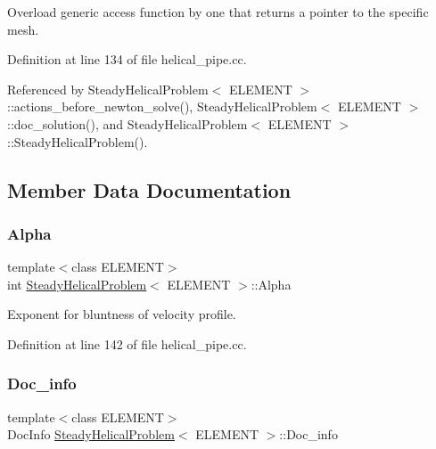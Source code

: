 Overload generic access function by one that returns a pointer to the specific mesh. 



Definition at line 134 of file helical\+\_\+pipe.\+cc.



Referenced by Steady\+Helical\+Problem$<$ E\+L\+E\+M\+E\+N\+T $>$\+::actions\+\_\+before\+\_\+newton\+\_\+solve(), Steady\+Helical\+Problem$<$ E\+L\+E\+M\+E\+N\+T $>$\+::doc\+\_\+solution(), and Steady\+Helical\+Problem$<$ E\+L\+E\+M\+E\+N\+T $>$\+::\+Steady\+Helical\+Problem().



\subsection{Member Data Documentation}
\mbox{\label{classSteadyHelicalProblem_ae4357e3857463d21083f82a821aac10b}} 
\subsubsection{\texorpdfstring{Alpha}{Alpha}}
{\footnotesize\ttfamily template$<$class E\+L\+E\+M\+E\+NT$>$ \\
int \hyperlink{classSteadyHelicalProblem}{Steady\+Helical\+Problem}$<$ E\+L\+E\+M\+E\+NT $>$\+::Alpha\hspace{0.3cm}{\ttfamily [private]}}



Exponent for bluntness of velocity profile. 



Definition at line 142 of file helical\+\_\+pipe.\+cc.

\mbox{\label{classSteadyHelicalProblem_a2b9bd1b93bad29a341e1718599a8a445}} 
\subsubsection{\texorpdfstring{Doc\+\_\+info}{Doc\_info}}
{\footnotesize\ttfamily template$<$class E\+L\+E\+M\+E\+NT$>$ \\
Doc\+Info \hyperlink{classSteadyHelicalProblem}{Steady\+Helical\+Problem}$<$ E\+L\+E\+M\+E\+NT $>$\+::Doc\+\_\+info\hspace{0.3cm}{\ttfamily [private]}}



